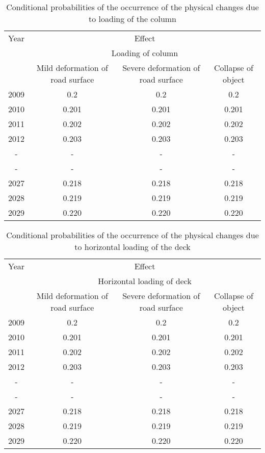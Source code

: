 \begin{table}
	\centering
	\caption{Conditional probabilities of the occurrence of the physical changes due to loading of the column} \label{tbleventfault:3}
\begin{tabular}{|c|c|c|c|}
\hline
Year & \multicolumn{3}{c|}{Effect} \\ 
\cline{2-4}
 & \multicolumn{3}{c|}{Loading of column} \\ 
\cline{2-4}
 & Mild deformation of road surface & Severe deformation of road surface & Collapse of object \\ 
\hline
2009 & 0.2 & 0.2 & 0.2 \\ 
\hline
2010 & 0.201 & 0.201 & 0.201 \\ 
\hline
2011 & 0.202 & 0.202 & 0.202 \\ 
\hline
2012 & 0.203 & 0.203 & 0.203 \\ 
\hline
- & - & - & - \\ 
- & - & - & - \\ 
\hline
2027 & 0.218 & 0.218 & 0.218 \\ 
\hline
2028 & 0.219 & 0.219 & 0.219 \\ 
\hline
2029 & 0.220 & 0.220 & 0.220 \\ 
\hline
\end{tabular}
\end{table}

\begin{table}
	\centering
	\caption{Conditional probabilities of the occurrence of the physical changes due to horizontal loading of the deck} \label{tbleventfault:4}
\begin{tabular}{|c|c|c|c|}
\hline
Year & \multicolumn{3}{c|}{Effect} \\ 
\cline{2-4}
 & \multicolumn{3}{c|}{Horizontal loading of deck} \\ 
\cline{2-4}
 & Mild deformation of road surface & Severe deformation of road surface & Collapse of object \\ 
\hline
2009 & 0.2 & 0.2 & 0.2 \\ 
\hline
2010 & 0.201 & 0.201 & 0.201 \\ 
\hline
2011 & 0.202 & 0.202 & 0.202 \\ 
\hline
2012 & 0.203 & 0.203 & 0.203 \\ 
\hline
- & - & - & - \\ 
- & - & - & - \\ 
\hline
2027 & 0.218 & 0.218 & 0.218 \\ 
\hline
2028 & 0.219 & 0.219 & 0.219 \\ 
\hline
2029 & 0.220 & 0.220 & 0.220 \\ 
\hline
\end{tabular}
\end{table}

